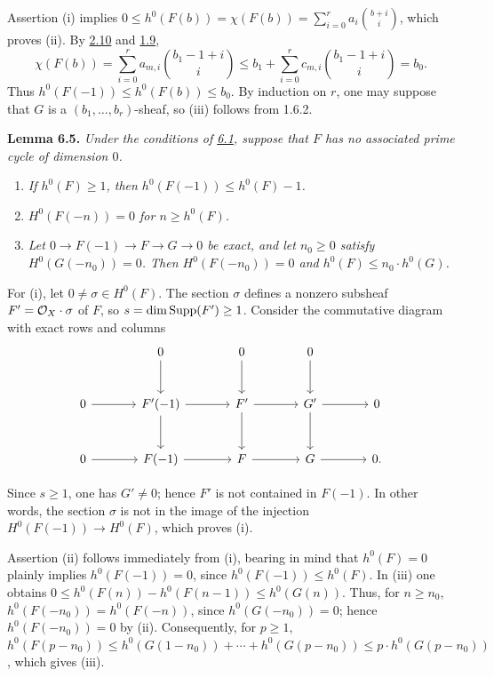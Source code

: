 Assertion (i) implies
$0\leq h^0(F(b))=\chi(F(b))
=\sum_{i=0}^{r}a_i\binom{b+i}{i}$, which proves (ii). By \hyperlink{sga6.e13.rem.2-10}{2.10} and \hyperlink{sga6.e13.def.1-9}{1.9},
\[
  \chi(F(b))
  =\sum_{i=0}^{r}a_{m,i}\binom{b_1-1+i}{i}
  \leq b_1+\sum_{i=0}^{r}c_{m,i}\binom{b_1-1+i}{i}
  =b_0.
\]
Thus $h^0(F(-1))\leq h^0(F(b))\leq b_0$. By induction on $r$, one may suppose that $G$ is a $(b_1,\ldots,b_r)$-sheaf, so (iii) follows from 1.6.2.

\textbf{Lemma 6.5.} \emph{Under the conditions of \hyperlink{sga6.e13.para.6-1}{6.1}, suppose that $F$
has no associated prime cycle of dimension $0$.}
\begin{enumerate}[label=(\roman*)]
\item \emph{If $h^0(F)\geq1$, then $h^0(F(-1))\leq h^0(F)-1$.}
\item \emph{$H^0(F(-n))=0$ for $n\geq h^0(F)$.}
\item \emph{Let $0\to F(-1)\to F\to G\to0$ be exact, and let
$n_0\geq0$ satisfy $H^0(G(-n_0))=0$. Then $H^0(F(-n_0))=0$ and
$h^0(F)\leq n_0\cdot h^0(G)$.}
\end{enumerate}

For (i), let $0\ne\sigma\in H^0(F)$. The section $\sigma$ defines a nonzero subsheaf $F'=\mathcal O_X\cdot\sigma$ of $F$, so $s=\dim\operatorname{Supp}(F')\geq1$. Consider the commutative diagram with exact rows and columns
\[
\begin{tikzcd}[column sep=large,row sep=large]
&0 \arrow[d]&0 \arrow[d]&0 \arrow[d]&\\
0 \arrow[r]&F'(-1) \arrow[r] \arrow[d]&F' \arrow[r] \arrow[d]&G' \arrow[r] \arrow[d]&0\\
0 \arrow[r]&F(-1) \arrow[r]&F \arrow[r]&G \arrow[r]&0.
\end{tikzcd}
\]

Since $s\geq1$, one has $G'\ne0$; hence $F'$ is not contained in $F(-1)$. In other words, the section $\sigma$ is not in the image of the injection $H^0(F(-1))\to H^0(F)$, which proves (i).

Assertion (ii) follows immediately from (i), bearing in mind that
$h^0(F)=0$ plainly implies $h^0(F(-1))=0$, since
$h^0(F(-1))\leq h^0(F)$. In (iii) one obtains
$0\leq h^0(F(n))-h^0(F(n-1))\leq h^0(G(n))$.
Thus, for $n\geq n_0$, $h^0(F(-n_0))=h^0(F(-n))$, since $h^0(G(-n_0))=0$; hence $h^0(F(-n_0))=0$ by (ii). Consequently, for $p\geq1$,
$h^0(F(p-n_0))
\leq h^0(G(1-n_0))+\cdots+h^0(G(p-n_0))
\leq p\cdot h^0(G(p-n_0))$,
which gives (iii).

